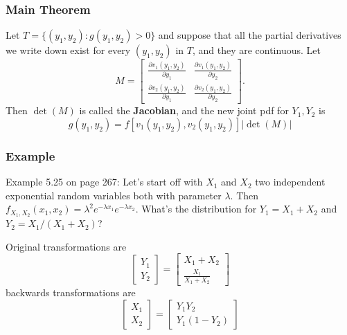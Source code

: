 \documentclass{beamer}
\begin{document}
\begin{frame}
\frametitle{Main Theorem}

Let $T = \{(y_1, y_2) : g(y_1, y_2) > 0 \}$ and suppose that all the partial derivatives we write down exist for every $(y_1,y_2)$ in $T$, and they are continuous. Let 
\[ M = 
\left[ \begin{array}{cc}
\frac{\partial v_1(y_1, y_2)}{\partial y_1} & \frac{\partial v_1(y_1, y_2)}{\partial y_2} \\
\frac{\partial v_2(y_1, y_2)}{\partial y_1} & \frac{\partial v_2(y_1, y_2)}{\partial y_2}  \end{array} \right].
\] 
Then $\operatorname{det}(M)$ is called the \textbf{Jacobian}, and the new joint pdf for $Y_1, Y_2$ is
\[
g(y_1,y_2) = f[v_1(y_1,y_2), v_2(y_1, y_2)] |\operatorname{det}(M)|
\]
\end{frame}

\begin{frame}
\frametitle{Example}

Example 5.25 on page 267: Let's start off with $X_1$ and $X_2$ two independent exponential random variables both with parameter $\lambda$. Then $f_{X_1,X_2}(x_1,x_2) = \lambda^2 e^{-\lambda x_1} e^{-\lambda x_2}$. What's the distribution for $Y_1 = X_1 + X_2$ and $Y_2 = X_1/(X_1 + X_2)$?
\pause

Original transformations are 
\[
\left[ \begin{array}{c}
Y_1  \\
Y_2 \end{array} \right]
=
\left[ \begin{array}{c}
X_1 + X_2  \\
\frac{X_1}{X_1 + X_2} \end{array} \right]
\] 
backwards transformations are 
\[
\left[ \begin{array}{c}
X_1  \\
X_2 \end{array} \right]
=
\left[ \begin{array}{c}
Y_1Y_2 \\
Y_1(1 - Y_2) \end{array} \right]
\] 
\end{frame}
\end{document}

